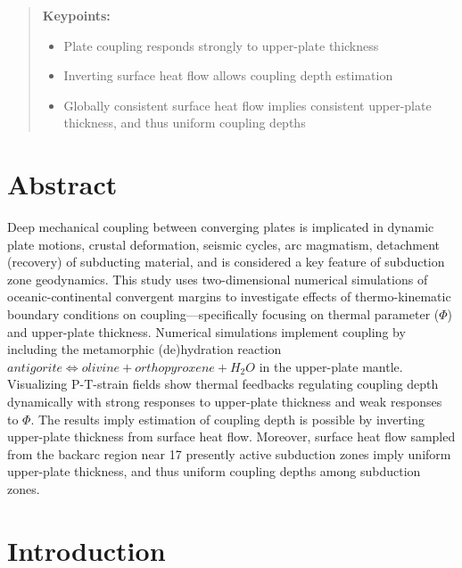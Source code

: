 
\begin{quote}
\textbf{Keypoints:}

\begin{itemize}
\item
  Plate coupling responds strongly to upper-plate thickness
\item
  Inverting surface heat flow allows coupling depth estimation
\item
  Globally consistent surface heat flow implies consistent upper-plate thickness, and thus uniform coupling depths
\end{itemize}
\end{quote}

\hypertarget{chpt2Abstract}{%
\section{Abstract}\label{chpt2Abstract}}

Deep mechanical coupling between converging plates is implicated in dynamic plate motions, crustal deformation, seismic cycles, arc magmatism, detachment (recovery) of subducting material, and is considered a key feature of subduction zone geodynamics. This study uses two-dimensional numerical simulations of oceanic-continental convergent margins to investigate effects of thermo-kinematic boundary conditions on coupling---specifically focusing on thermal parameter (\(\Phi\)) and upper-plate thickness. Numerical simulations implement coupling by including the metamorphic (de)hydration reaction \(antigorite \allowbreak \Leftrightarrow olivine + orthopyroxene + H_{2}O\) in the upper-plate mantle. Visualizing P-T-strain fields show thermal feedbacks regulating coupling depth dynamically with strong responses to upper-plate thickness and weak responses to \(\Phi\). The results imply estimation of coupling depth is possible by inverting upper-plate thickness from surface heat flow. Moreover, surface heat flow sampled from the backarc region near 17 presently active subduction zones imply uniform upper-plate thickness, and thus uniform coupling depths among subduction zones.

\hypertarget{chpt2Intro}{%
\section{Introduction}\label{chpt2Intro}}

